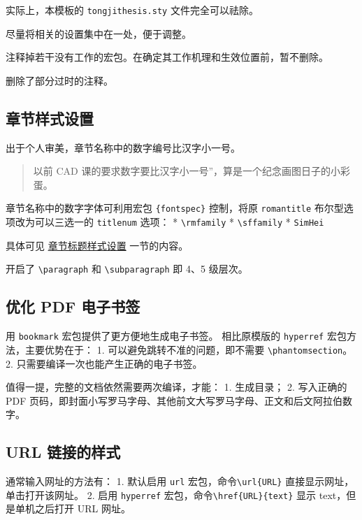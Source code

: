\documentclass[../Main/thesis.tex]{subfiles}
\begin{document}
实际上，本模板的 \texttt{tongjithesis.sty} 文件完全可以祛除。

尽量将相关的设置集中在一处，便于调整。

注释掉若干没有工作的宏包。在确定其工作机理和生效位置前，暂不删除。

删除了部分过时的注释。

\subsection{章节样式设置}

出于个人审美，章节名称中的数字编号比汉字小一号。

\begin{quote}
以前 CAD 课的要求数字要比汉字小一号''，算是一个纪念画图日子的小彩蛋。
\end{quote}

章节名称中的数字字体可利用宏包 \texttt{\{fontspec\}} 控制，将原
\texttt{romantitle} 布尔型选项改为可以三选一的 \texttt{titlenum} 选项：
* \texttt{\textbackslash{}rmfamily} * \texttt{\textbackslash{}sffamily}
* \texttt{SimHei}

具体可见
\protect\hyperlink{ux5cux25E7ux5cux25ABux5cux25A0ux5cux25E8ux5cux258Aux5cux2582ux5cux25E6ux5cux25A0ux5cux2587ux5cux25E9ux5cux25A2ux5cux2598ux5cux25E6ux5cux25A0ux5cux25B7ux5cux25E5ux5cux25BCux5cux258Fux5cux25E8ux5cux25AEux5cux25BEux5cux25E7ux5cux25BDux5cux25AE}{章节标题样式设置}
一节的内容。

开启了 \texttt{\textbackslash{}paragraph} 和
\texttt{\textbackslash{}subparagraph} 即 4、5 级层次。

\subsection{优化 PDF 电子书签}

用 \texttt{bookmark} 宏包提供了更方便地生成电子书签。 相比原模版的
\texttt{hyperref} 宏包方法，主要优势在于： 1.
可以避免跳转不准的问题，即不需要
\texttt{\textbackslash{}phantomsection}。 2.
只需要编译一次也能产生正确的电子书签。

值得一提，完整的文档依然需要两次编译，才能： 1. 生成目录； 2. 写入正确的
PDF
页码，即封面小写罗马字母、其他前文大写罗马字母、正文和后文阿拉伯数字。

\subsection{URL 链接的样式}

通常输入网址的方法有： 1. 默认启用 \texttt{url}
宏包，命令\texttt{\textbackslash{}url\{URL\}}
直接显示网址，单击打开该网址。 2. 启用 \texttt{hyperref}
宏包，命令\texttt{\textbackslash{}href\{URL\}\{text\}} 显示
text，但是单机之后打开 URL 网址。
\end{document}
